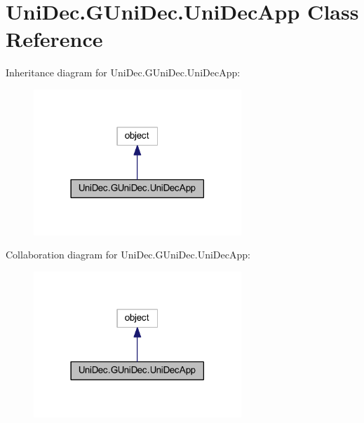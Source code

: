 \hypertarget{class_uni_dec_1_1_g_uni_dec_1_1_uni_dec_app}{}\section{Uni\+Dec.\+G\+Uni\+Dec.\+Uni\+Dec\+App Class Reference}
\label{class_uni_dec_1_1_g_uni_dec_1_1_uni_dec_app}


Inheritance diagram for Uni\+Dec.\+G\+Uni\+Dec.\+Uni\+Dec\+App\+:\nopagebreak
\begin{figure}[H]
\begin{center}
\leavevmode
\includegraphics[width=222pt]{class_uni_dec_1_1_g_uni_dec_1_1_uni_dec_app__inherit__graph}
\end{center}
\end{figure}


Collaboration diagram for Uni\+Dec.\+G\+Uni\+Dec.\+Uni\+Dec\+App\+:\nopagebreak
\begin{figure}[H]
\begin{center}
\leavevmode
\includegraphics[width=222pt]{class_uni_dec_1_1_g_uni_dec_1_1_uni_dec_app__coll__graph}
\end{center}
\end{figure}
